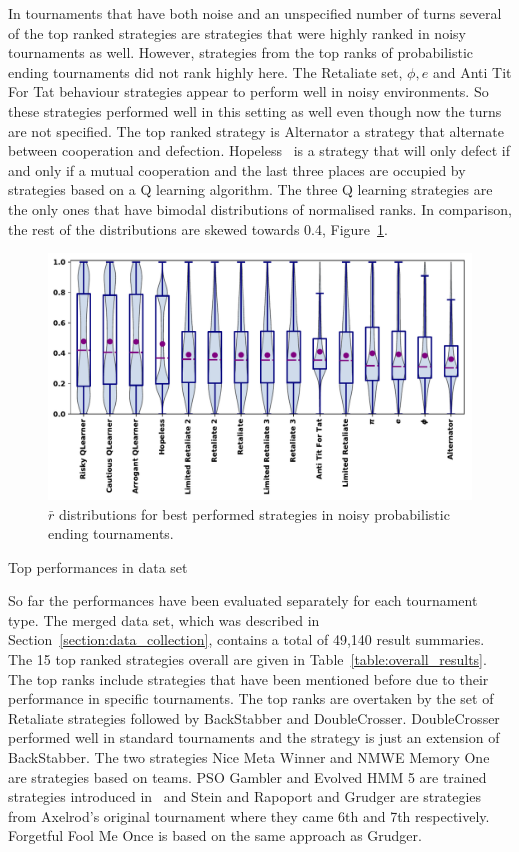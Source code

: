 \documentclass{article}
\begin{document}
In tournaments that have both noise and an unspecified number of turns several
of the top ranked strategies are strategies that were highly ranked in
noisy tournaments as well. However, strategies from the top ranks of
probabilistic ending tournaments did not rank highly here. The Retaliate set,
$\phi, e$ and Anti Tit For Tat behaviour strategies appear to perform well in
noisy environments. So these strategies performed well in this setting as well
even though now the turns are not specified.
The top ranked strategy is Alternator a strategy that alternate between
cooperation and defection. Hopeless~\cite{Van2015} is a strategy that will only
defect if and only if a mutual cooperation and the last three places are
occupied by strategies based on a Q learning algorithm. The three Q learning
strategies are the only ones that have bimodal distributions of normalised
ranks. In comparison, the rest of the distributions are skewed towards
0.4, Figure~\ref{fig:noisy_probend_results}.

\begin{figure}[!htbp]
    \centering
    \includegraphics[width=.7\textwidth]{../images/performance_probend_noise.pdf}
    \caption{\(\bar{r}\) distributions for best performed strategies in noisy
    probabilistic ending tournaments.}
    \label{fig:noisy_probend_results}
\end{figure}

\begin{table}[!htbp]
    \centering
    \resizebox{.35\textwidth}{!}{
    }
    \caption{Top performances in data set}\label{table:overall_results}
\end{table}

So far the performances have been evaluated separately for each tournament
type. The merged data set, which was described in Section~\ref{section:data_collection},
contains a total of 49,140 result summaries. The 15 top ranked strategies
overall are given in Table~\ref{table:overall_results}. The top ranks
include strategies that have been mentioned before due to their performance
in specific tournaments. The top ranks are overtaken by the set of Retaliate
strategies followed by BackStabber and DoubleCrosser. DoubleCrosser performed
well in standard tournaments and the strategy is just an extension of BackStabber.
The two strategies Nice Meta Winner and NMWE Memory One are strategies based on teams.
PSO Gambler and Evolved HMM 5 are trained strategies introduced in~\cite{Harper2017}
and Stein and Rapoport and Grudger are strategies from Axelrod's
original tournament where they came 6th and 7th respectively. Forgetful Fool Me
Once is based on the same approach as Grudger.
\end{document}
